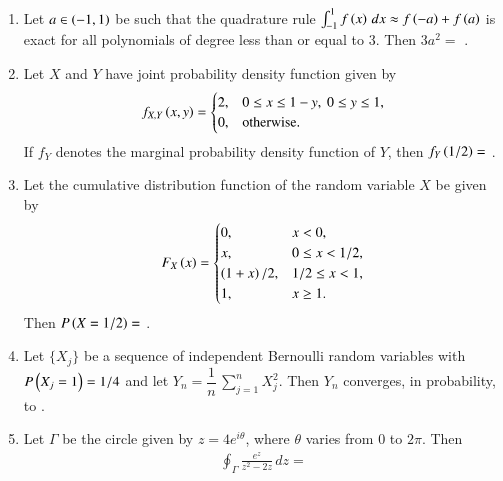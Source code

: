 \documentclass[journal,12pt,onecolumn]{IEEEtran}
\theoremstyle{remark}
\begin{document}
\begin{enumerate}[start=10]
\hfill{}

\item Let $a \in \left(-1, 1\right)$ be such that the quadrature rule $\int_{-1}^{1} f\left(x\right)\, dx \approx f\left(-a\right) + f\left(a\right)$
is exact for all polynomials of degree less than or equal to $3$. Then $3a^2 = $ \underline{\hspace{2cm}}.\\ 

\item Let $X$ and $Y$ have joint probability density function given by
\begin{align*}
f_{X,Y}\left(x, y\right) =
\begin{cases}
2, & 0 \le x \le 1- y,\ 0 \le y \le 1,\\
0, & \text{otherwise.}
\end{cases}
\end{align*}
If $f_Y$ denotes the marginal probability density function of $Y$, then $f_Y\left(1/2\right) = $ \underline{\hspace{2cm}}. \\ 

\item Let the cumulative distribution function of the random variable $X$ be given by
\begin{align*}
F_X\left(x\right) =
\begin{cases}
0, & x < 0,\\
x, & 0 \le x < 1/2,\\
\left(1 + x\right)/2, & 1/2 \le x < 1,\\
1, & x \ge 1.
\end{cases}
\end{align*}
Then $P\left(X = 1/2\right) = $ \underline{\hspace{2cm}}.

\hfill{}

\item Let $\{X_j\}$ be a sequence of independent Bernoulli random variables with $P\left(X_j = 1\right) = 1/4$
and let $Y_n = \dfrac{1}{n}\,\sum_{j=1}^{n} X_j^2$. Then $Y_n$ converges, in probability, to \underline{\hspace{2cm}}. 
\hfill{}


\item Let $\Gamma$ be the circle given by $z = 4e^{i\theta}$, where $\theta$ varies from $0$ to $2\pi$. Then
\begin{align*}
\oint_{\Gamma} \frac{e^{z}}{z^2 - 2z}\, dz =
\end{align*}


\end{enumerate}
\end{document}

